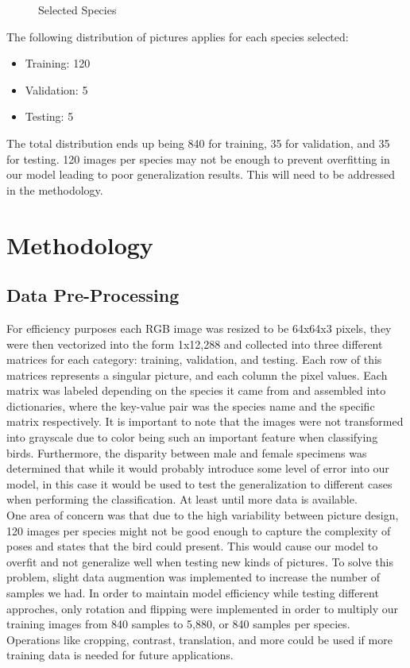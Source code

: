 \documentclass[11pt]{article}
\begin{document}
\begin{singlespace}
\begin{figure}[h]
    
    \caption{Selected Species}
    \label{selected species}
\end{figure}

The following distribution of pictures applies for each species selected:
\begin{itemize}
\item Training: 120
\item Validation: 5
\item Testing: 5
\end{itemize}

The total distribution ends up being 840 for training, 35 for validation, and 35 for testing. 120 images per species may not be enough to prevent overfitting in our model leading to poor generalization results. This will need to be addressed in the methodology.  \\

\section{Methodology}
\subsection{Data Pre-Processing}

For efficiency purposes each RGB image was resized to be 64x64x3 pixels, they were then vectorized into the form 1x12,288 and collected into three different matrices for each category: training, validation, and testing. Each row of this matrices represents a singular picture, and each column the pixel values. Each matrix was labeled depending on the species it came from and assembled into dictionaries, where the key-value pair was the species name and the specific matrix respectively. It is important to note that the images were not transformed into grayscale due to color being such an important feature when classifying birds. Furthermore, the disparity between male and female specimens was determined that while it would probably introduce some level of error into our model, in this case it would be used to test the generalization to different cases when performing the classification. At least until more data is available.\\

One area of concern was that due to the high variability between picture design, 120 images per species might not be good enough to capture the complexity of poses and states that the bird could present. This would cause our model to overfit and not generalize well when testing new kinds of pictures. To solve this problem, slight data augmention was implemented to increase the number of samples we had. In order to maintain model efficiency while testing different approches, only rotation and flipping were implemented in order to multiply our training images from 840 samples to 5,880, or 840 samples per species. Operations like cropping, contrast, translation, and more could be used if more training data is needed for future applications. \\


\end{singlespace}
\end{document}
